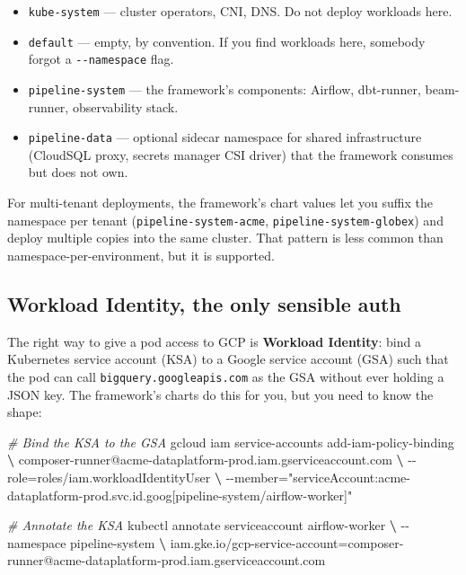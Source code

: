 \documentclass[
  11pt,
  british,
  oneside]{book}
\newenvironment{Shaded}{\begin{snugshade}}{\end{snugshade}}
\newcommand{\CommentTok}[1]{\textcolor[rgb]{0.56,0.35,0.01}{\textit{#1}}}
\newcommand{\ExtensionTok}[1]{#1}
\newcommand{\KeywordTok}[1]{\textcolor[rgb]{0.13,0.29,0.53}{\textbf{#1}}}
\newcommand{\NormalTok}[1]{#1}
\newcommand{\StringTok}[1]{\textcolor[rgb]{0.31,0.60,0.02}{#1}}
\providecommand{\tightlist}{%
  \setlength{\itemsep}{0pt}\setlength{\parskip}{0pt}}
\begin{document}
\begin{itemize}
\tightlist
\item
  \texttt{kube-system} --- cluster operators, CNI, DNS. Do not deploy
  workloads here.
\item
  \texttt{default} --- empty, by convention. If you find workloads here,
  somebody forgot a \texttt{-\/-namespace} flag.
\item
  \texttt{pipeline-system} --- the framework's components: Airflow,
  dbt-runner, beam-runner, observability stack.
\item
  \texttt{pipeline-data} --- optional sidecar namespace for shared
  infrastructure (CloudSQL proxy, secrets manager CSI driver) that the
  framework consumes but does not own.
\end{itemize}

For multi-tenant deployments, the framework's chart values let you
suffix the namespace per tenant (\texttt{pipeline-system-acme},
\texttt{pipeline-system-globex}) and deploy multiple copies into the
same cluster. That pattern is less common than
namespace-per-environment, but it is supported.

\hypertarget{workload-identity-the-only-sensible-auth}{%
\subsection{Workload Identity, the only sensible
auth}\label{workload-identity-the-only-sensible-auth}}

The right way to give a pod access to GCP is \textbf{Workload
Identity}: bind a Kubernetes service account
(KSA) to a Google service account (GSA) such that the pod can call
\texttt{bigquery.googleapis.com} as the GSA without ever holding a JSON
key. The framework's charts do this for you, but you need to know the
shape:

\begin{Shaded}
\begin{Highlighting}[]
\CommentTok{\# Bind the KSA to the GSA}
\ExtensionTok{gcloud}\NormalTok{ iam service{-}accounts add{-}iam{-}policy{-}binding }\KeywordTok{\textbackslash{}}
  \ExtensionTok{composer{-}runner@acme{-}dataplatform{-}prod.iam.gserviceaccount.com} \KeywordTok{\textbackslash{}}
  \ExtensionTok{{-}{-}role}\NormalTok{=roles/iam.workloadIdentityUser }\KeywordTok{\textbackslash{}}
  \ExtensionTok{{-}{-}member}\NormalTok{=}\StringTok{"serviceAccount:acme{-}dataplatform{-}prod.svc.id.goog[pipeline{-}system/airflow{-}worker]"}

\CommentTok{\# Annotate the KSA}
\ExtensionTok{kubectl}\NormalTok{ annotate serviceaccount airflow{-}worker }\KeywordTok{\textbackslash{}}
  \ExtensionTok{{-}{-}namespace}\NormalTok{ pipeline{-}system }\KeywordTok{\textbackslash{}}
  \ExtensionTok{iam.gke.io}\NormalTok{/}\ExtensionTok{gcp{-}service{-}account}\NormalTok{=composer{-}runner@acme{-}dataplatform{-}prod.iam.gserviceaccount.com}
\end{Highlighting}
\end{Shaded}
\end{document}
